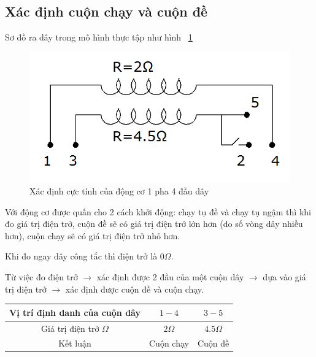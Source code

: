 \documentclass[13pt,a4paper]{extarticle}
\begin{document}
\subsection{Xác định cuộn chạy và cuộn đề}
\label{sec:chay-tu-de}
Sơ đồ ra dây trong mô hình thực tập như hình ~\ref{Fig:So-do-ra-day-thuc-tap}
\begin{figure}[!h]
\begin{center}
\includegraphics[scale=.5]{dau-day-thuc-te}
\end{center}
\caption{Xác định cực tính của động cơ 1 pha 4 đầu dây}\label{Fig:So-do-ra-day-thuc-tap}
\end{figure}
\begin{list}{--}{}
\item Với động cơ được quấn cho 2 cách khởi động: chạy tụ đề và chạy tụ ngậm thì khi đo giá trị điện trở, cuộn đề sẽ có giá trị điện trở lớn hơn (do số vòng dây nhiều hơn), cuộn chạy sẽ có giá trị điện trở nhỏ hơn.
\item Khi đo ngay dây công tắc thì điện trở là $0 \Omega$.
\item Từ việc đo điện trở $\longrightarrow$ xác định được 2 đầu của một cuộn dây $\longrightarrow$ dựa vào giá trị điện trở $\longrightarrow$ xác định được cuộn đề và cuộn chạy. 
\begin{center}
\begin{tabular}{|c|c|c|}\hline
Vị trí định danh của cuộn dây & $1-4$ & $3 - 5$\\ \hline
Giá trị điện trở $\Omega$ & $2 \Omega$ & $4.5\Omega$\\ \hline
Kết luận & Cuộn chạy & Cuộn đề\\ \hline
\end{tabular}
\end{center}
\end{list}
\newpage
\end{document}
